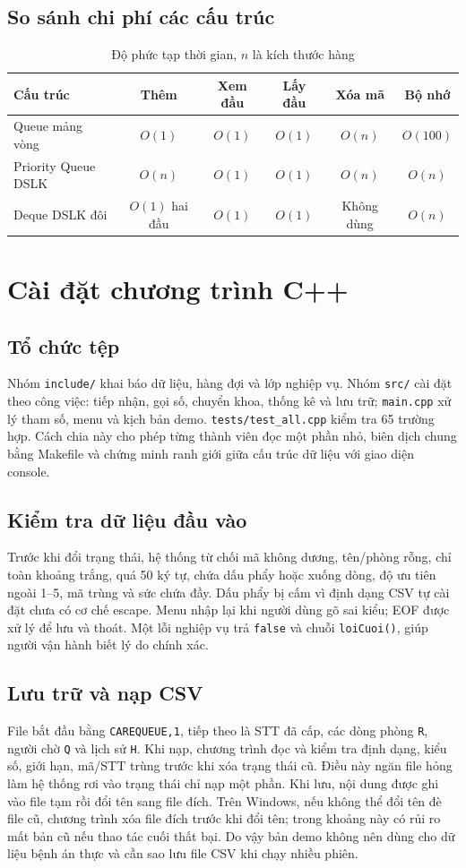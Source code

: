\documentclass[12pt,a4paper,oneside]{report}
\begin{document}
\section{So sánh chi phí các cấu trúc}
\begin{table}[H]\centering\caption{Độ phức tạp thời gian, $n$ là kích thước hàng}
\begin{tabular}{p{3.2cm}ccccc}\toprule
Cấu trúc & Thêm & Xem đầu & Lấy đầu & Xóa mã & Bộ nhớ\\\midrule
Queue mảng vòng & $O(1)$ & $O(1)$ & $O(1)$ & $O(n)$ & $O(100)$\\
Priority Queue DSLK & $O(n)$ & $O(1)$ & $O(1)$ & $O(n)$ & $O(n)$\\
Deque DSLK đôi & $O(1)$ hai đầu & $O(1)$ & $O(1)$ & Không dùng & $O(n)$\\\bottomrule
\end{tabular}
\end{table}

\chapter{Cài đặt chương trình C++}
\section{Tổ chức tệp}
Nhóm \texttt{include/} khai báo dữ liệu, hàng đợi và lớp nghiệp vụ. Nhóm \texttt{src/} cài đặt theo công việc: tiếp nhận, gọi số, chuyển khoa, thống kê và lưu trữ; \texttt{main.cpp} xử lý tham số, menu và kịch bản demo. \texttt{tests/test\_all.cpp} kiểm tra 65 trường hợp. Cách chia này cho phép từng thành viên đọc một phần nhỏ, biên dịch chung bằng Makefile và chứng minh ranh giới giữa cấu trúc dữ liệu với giao diện console.

\section{Kiểm tra dữ liệu đầu vào}
Trước khi đổi trạng thái, hệ thống từ chối mã không dương, tên/phòng rỗng, chỉ toàn khoảng trắng, quá 50 ký tự, chứa dấu phẩy hoặc xuống dòng, độ ưu tiên ngoài 1--5, mã trùng và sức chứa đầy. Dấu phẩy bị cấm vì định dạng CSV tự cài đặt chưa có cơ chế escape. Menu nhập lại khi người dùng gõ sai kiểu; EOF được xử lý để lưu và thoát. Một lỗi nghiệp vụ trả \texttt{false} và chuỗi \texttt{loiCuoi()}, giúp người vận hành biết lý do chính xác.

\section{Lưu trữ và nạp CSV}
File bắt đầu bằng \texttt{CAREQUEUE,1}, tiếp theo là STT đã cấp, các dòng phòng \texttt{R}, người chờ \texttt{Q} và lịch sử \texttt{H}. Khi nạp, chương trình đọc và kiểm tra định dạng, kiểu số, giới hạn, mã/STT trùng trước khi xóa trạng thái cũ. Điều này ngăn file hỏng làm hệ thống rơi vào trạng thái chỉ nạp một phần. Khi lưu, nội dung được ghi vào file tạm rồi đổi tên sang file đích. Trên Windows, nếu không thể đổi tên đè file cũ, chương trình xóa file đích trước khi đổi tên; trong khoảng này có rủi ro mất bản cũ nếu thao tác cuối thất bại. Do vậy bản demo không nên dùng cho dữ liệu bệnh án thực và cần sao lưu file CSV khi chạy nhiều phiên.
\end{document}
